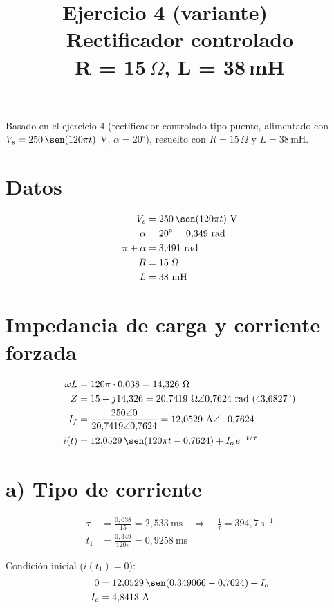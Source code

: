 \documentclass[11pt]{article}
\title{Ejercicio 4 (variante) --- Rectificador controlado\\ R = 15\,$\Omega$, L = 38\,mH}
\author{}
\date{}
\begin{document}
\maketitle

Basado en el ejercicio 4 (rectificador controlado tipo puente, alimentado con
$V_s = 250\,\sen(120\pi t)$ V, $\alpha = 20^\circ$), resuelto con
$R = 15\,\Omega$ y $L = 38$\,mH.

\section*{Datos}

\begin{align*}
V_s &= 250\,\sen(120\pi t)\ \text{V} \\
\alpha &= 20^\circ = 0{,}349\ \text{rad} \\
\pi+\alpha &= 3{,}491\ \text{rad} \\
R &= 15\ \Omega \\
L &= 38\ \text{mH}
\end{align*}

\section*{Impedancia de carga y corriente forzada}

\begin{align*}
\omega L &= 120\pi \cdot 0{,}038 = 14{,}326\ \Omega \\
Z &= 15 + j14{,}326 = 20{,}7419\ \Omega \angle 0{,}7624\ \text{rad } (43{,}6827^\circ) \\
I_f &= \frac{250\angle 0}{20{,}7419\angle 0{,}7624} = 12{,}0529\ \text{A} \angle{-0{,}7624} \\
i(t) &= 12{,}0529\,\sen(120\pi t - 0{,}7624) + I_o\,e^{-t/\tau}
\end{align*}

\section*{a) Tipo de corriente}

\begin{align*}
\tau &= \frac{0{,}038}{15} = 2{,}533\ \text{ms} \quad \Rightarrow \quad \frac{1}{\tau} = 394{,}7\ \text{s}^{-1} \\
t_1 &= \frac{0{,}349}{120\pi} = 0{,}9258\ \text{ms}
\end{align*}

Condici\'on inicial ($i(t_1)=0$):
\begin{align*}
0 &= 12{,}0529\,\sen(0{,}349066 - 0{,}7624) + I_o \\
I_o &= 4{,}8413\ \text{A}
\end{align*}
\end{document}
